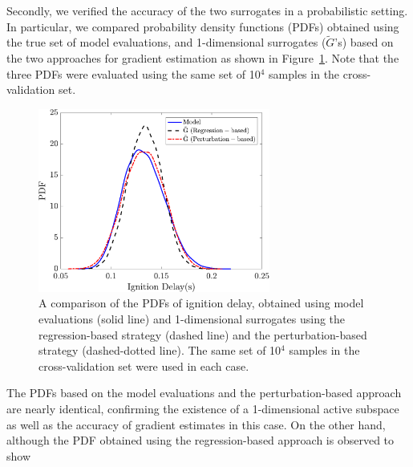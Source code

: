 Secondly, we verified the accuracy of the two surrogates in a probabilistic setting. In particular, we compared 
probability density functions (PDFs) obtained using the true set of model evaluations, and 1-dimensional
surrogates ($\tilde{G}$'s) based on the two approaches for gradient estimation as shown in Figure~\ref{fig:pdf_33D}.
Note that the three PDFs were evaluated using the same set of 10$^4$ samples in the cross-validation set. 
%
\begin{figure}[htbp]
\begin{center}
\includegraphics[width=3.0in]{./Figures/pdf_comp_id_1e4}
\end{center} 
\caption{A comparison of the PDFs of ignition delay, obtained using model 
evaluations (solid line) and 1-dimensional surrogates using the regression-based strategy (dashed line) and the
perturbation-based strategy (dashed-dotted line). The same set of 10$^4$ samples in the cross-validation set were 
used in each case.}
\label{fig:pdf_33D}
\end{figure}
%
%
%
The PDFs based on the model evaluations and the perturbation-based approach are nearly identical, confirming
the existence of a 1-dimensional active subspace as well as the accuracy of gradient estimates in this case. 
On the other hand, although the PDF obtained using the regression-based approach  is observed to show
